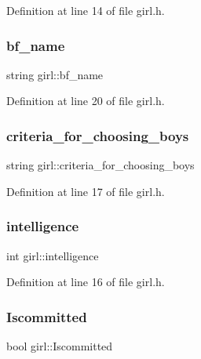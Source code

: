 Definition at line 14 of file girl.\+h.

\mbox{\label{classgirl_a2de471a846b3cb724daef9b70e6614f7}} 
\subsubsection{\texorpdfstring{bf\+\_\+name}{bf\_name}}
{\footnotesize\ttfamily string girl\+::bf\+\_\+name}



Definition at line 20 of file girl.\+h.

\mbox{\label{classgirl_a9ba2affef7bf8c54fc3ca7c0e16a1f1b}} 
\subsubsection{\texorpdfstring{criteria\+\_\+for\+\_\+choosing\+\_\+boys}{criteria\_for\_choosing\_boys}}
{\footnotesize\ttfamily string girl\+::criteria\+\_\+for\+\_\+choosing\+\_\+boys}



Definition at line 17 of file girl.\+h.

\mbox{\label{classgirl_a6c7e5b42204c88fae8b91aae92ae17f1}} 
\subsubsection{\texorpdfstring{intelligence}{intelligence}}
{\footnotesize\ttfamily int girl\+::intelligence}



Definition at line 16 of file girl.\+h.

\mbox{\label{classgirl_a2e6c34b60f514827eb9809e015888ee3}} 
\subsubsection{\texorpdfstring{Iscommitted}{Iscommitted}}
{\footnotesize\ttfamily bool girl\+::\+Iscommitted}



